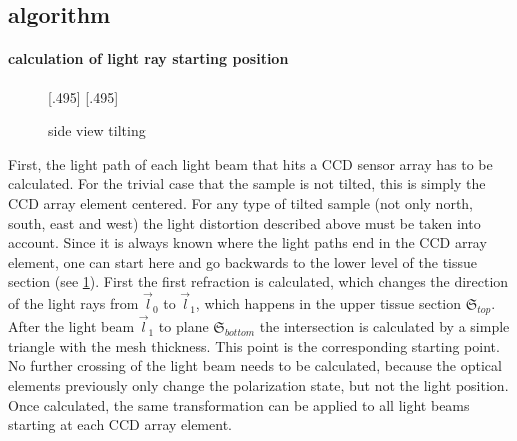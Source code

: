 \subsection{algorithm}
% 
\paragraph{calculation of light ray starting position}
% 
\begin{figure}[!t]
\def\tikzwidth{0.42\textwidth}
[.495\textwidth]{
\def\tilt{0}
\def\nindex{2.25}
}\hfill
{}[.495\textwidth]{
}
\caption{side view tilting}
\label{fig:tilted_side_view}
\end{figure}
% 
First, the light path of each light beam that hits a \ac{CCD} sensor array has to be calculated.
For the trivial case that the sample is not tilted, this is simply the \ac{CCD} array element centered.
For any type of tilted sample (not only north, south, east and west) the light distortion described above must be taken into account.
Since it is always known where the light paths end in the \ac{CCD} array element, one can start here and go backwards to the lower level of the tissue section (see \cref{fig:tilted_side_view}).
First the first refraction is calculated, which changes the direction of the light rays from $\vec{l}_0$ to $\vec{l}_1$, which happens in the upper tissue section $\mathfrak{S}_{top}$.
After the light beam $\vec{l}_1$ to plane $\mathfrak{S}_{bottom}$ the intersection is calculated by a simple triangle with the mesh thickness.
This point is the corresponding starting point.
No further crossing of the light beam needs to be calculated, because the optical elements previously only change the polarization state, but not the light position.
Once calculated, the same transformation can be applied to all light beams starting at each \ac{CCD} array element.
% 
\begin{lstfloat}[!t]
	
	\caption{Pseudocode simulation}
	\label{alg:simulation}
\end{lstfloat}
% 
% 
